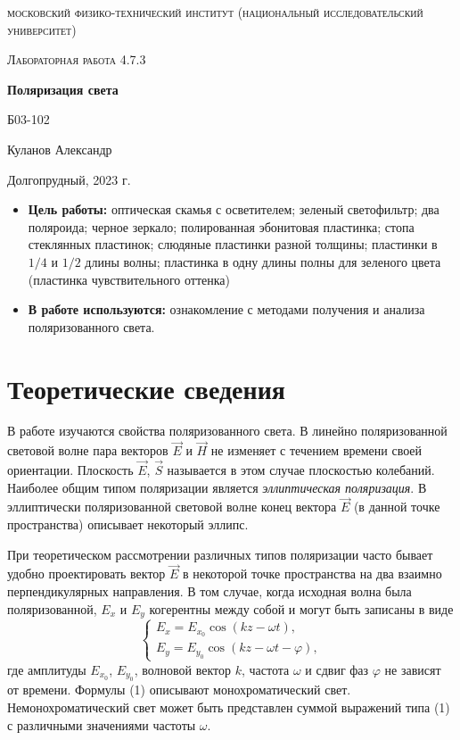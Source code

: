 \documentclass[a4paper, 12pt]{article}
\begin{document}
\begin{titlepage}
	\centering
	\vspace{5cm}
	{\scshape\LARGE московский физико-технический институт (национальный исследовательский университет) \par}
	\vspace{6cm}
	{\scshape\Large Лабораторная работа 4.7.3 \par}
	{\huge\bfseries Поляризация света \par}
	\vspace{1cm}
	\vfill
\begin{flushright}
	{\large Б03-102}\par
	\vspace{0.3cm}
	{\LARGE Куланов Александр}
\end{flushright}
	

	\vfill


	Долгопрудный, 2023 г.
\end{titlepage}

\begin{itemize}
	\item \textbf{Цель работы:} оптическая скамья с осветителем; зеленый светофильтр; два поляроида; черное зеркало; полированная эбонитовая пластинка; стопа стеклянных пластинок; слюдяные пластинки разной толщины; пластинки в $1/4$ и $1/2$ длины волны; пластинка в одну длины полны для зеленого цвета (пластинка чувствительного оттенка)
    \item \textbf{В работе используются:} ознакомление с методами получения и анализа поляризованного света.
\end{itemize}
\section{Теоретические сведения}

В работе изучаются свойства поляризованного света. В линейно поляризованной световой волне пара векторов $\vec{E}$ и $\vec{H}$ не изменяет с течением времени своей ориентации. Плоскость $\vec{E}$, $\vec{S}$ называется в этом случае плоскостью колебаний. Наиболее общим типом поляризации является \textit{эллиптическая поляризация}. В эллиптически поляризованной световой волне конец вектора $\vec{E}$ (в данной точке пространства) описывает некоторый эллипс.
	
	При теоретическом рассмотрении различных типов поляризации часто бывает удобно проектировать вектор $\vec{E}$ в некоторой точке пространства на два взаимно перпендикулярных направления. В том случае, когда исходная волна была поляризованной, $E_x$ и $E_y$ когерентны между собой и могут быть записаны в виде
	\begin{equation}
	\begin{cases}
	E_x = E_{x_0}\cos(kz - \omega t),\\
	E_y = E_{y_0}\cos(kz - \omega t-\varphi),
	\end{cases}
	\end{equation}
	где амплитуды $E_{x_0}$, $E_{y_0}$, волновой вектор $k$, частота $\omega$ и сдвиг фаз $\varphi$ не зависят от времени. Формулы (1) описывают монохроматический свет. Немонохроматический свет может быть представлен суммой выражений типа (1) с различными значениями частоты $\omega$.
	
\end{document}
